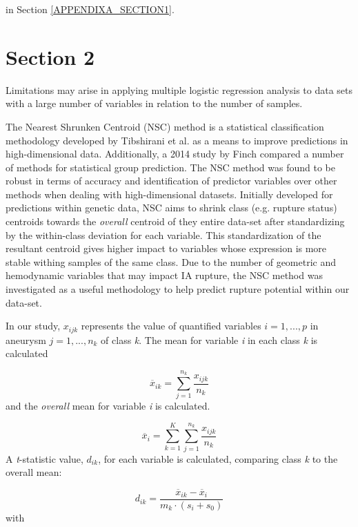    in 
Section \ref{APPENDIXA_SECTION1}.

\section{Section 2}\label{Nearest Shrunken Centroid}
Limitations may arise in applying multiple logistic regression analysis to data sets with a large number of variables in relation to the number of samples.

The Nearest Shrunken Centroid (NSC) method is a statistical classification methodology developed by Tibshirani et al.\cite{tibshirani2002diagnosis} as a means to improve predictions in high-dimensional data. Additionally, a 2014 study by Finch \cite{finch2014comparison} compared a number of methods for statistical group prediction. The NSC method was found to be robust in terms of accuracy and identification of predictor variables over other methods when dealing with high-dimensional datasets. Initially developed for predictions within genetic data, NSC aims to shrink class (e.g. rupture status) centroids towards the \textit{overall} centroid of they entire data-set after standardizing by the within-class deviation for each variable. This standardization of the resultant centroid gives higher impact to variables whose expression is more stable withing samples of the same class. Due to the number of  geometric and hemodynamic variables that may impact IA rupture, the NSC method was investigated as a useful methodology to help predict rupture potential within our data-set.

In our study, $x_{ijk}$ represents the value of quantified variables $i = 1, ..., p$ in aneurysm $j = 1,...,n_k$ of class \textit{k}. The mean for variable \textit{i} in each class \textit{k} is calculated

\begin{equation}
\label{variable_mean_NSC}
\overline{x}_{ik} = \sum_{j=1}^{n_k}\frac{x_{ijk}}{n_k}
\end{equation}
and the \textit{overall} mean for variable \textit{i} is calculated.

\begin{equation}
\label{overall_variable_mean_NSC}
\overline{x}_i =  \sum_{k=1}^{K} \sum_{j=1}^{n_k}\frac{x_{ijk}}{n_k}
\end{equation}
A \textit{t}-statistic value, $d_{ik}$, for each variable is calculated, comparing class \textit{k} to the overall mean:

\begin{equation}
\label{d_for_NSC}
d_{ik} = \frac{\overline{x}_{ik} - \overline{x}_i}{m_k \cdot (s_i + s_0)}
\end{equation}
with

